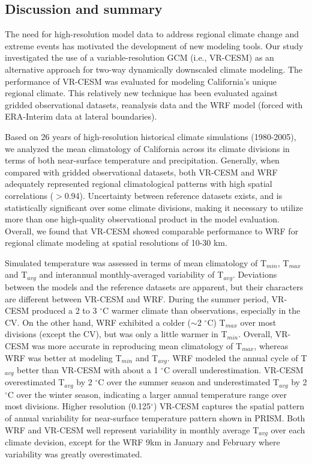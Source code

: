 \documentclass[draft,ms]{agutex}   %
\begin{document}
\begin{article}
\section{Discussion and summary} \label{sec:Discussion}

The need for high-resolution model data to address regional climate change and extreme events has motivated the development of new modeling tools.  Our study investigated the use of a variable-resolution GCM (i.e., VR-CESM) as an alternative approach for two-way dynamically downscaled climate modeling. The performance of VR-CESM was evaluated for modeling California's unique regional climate. This relatively new technique has been evaluated against gridded observational datasets, reanalysis data and the WRF model (forced with ERA-Interim data at lateral boundaries).

Based on 26 years of high-resolution historical climate simulations (1980-2005), we analyzed the mean climatology of California across its climate divisions in terms of both near-surface temperature and precipitation. Generally, when compared with gridded observational datasets, both VR-CESM and WRF adequately represented regional climatological patterns with high spatial correlations ($>$0.94). Uncertainty between reference datasets exists, and is statistically significant over some climate divisions, making it necessary to utilize more than one high-quality observational product in the model evaluation. Overall, we found that VR-CESM showed comparable performance to WRF for regional climate modeling at spatial resolutions of 10-30 km.


Simulated temperature was assessed in terms of mean climatology of T$_{min}$, T$_{max}$ and T$_{avg}$ and interannual monthly-averaged variability of T$_{avg}$.  Deviations between the models and the reference datasets are apparent, but their characters are different between VR-CESM and WRF. During the summer period, VR-CESM produced a 2 to 3 $^\circ$C warmer climate than observations, especially in the CV. On the other hand, WRF exhibited a colder ($\sim$2 $^\circ$C) T$_{max}$ over most divisions (except the CV), but was only a little warmer in T$_{min}$. Overall, VR-CESM was more accurate in reproducing mean climatology of T$_{max}$, whereas WRF was better at modeling T$_{min}$ and T$_{avg}$. WRF modeled the annual cycle of T$_{avg}$ better than VR-CESM with about a 1 $^\circ$C overall underestimation. VR-CESM overestimated T$_{avg}$ by 2 $^\circ$C over the summer season and underestimated T$_{avg}$ by 2 $^\circ$C over the winter season, indicating a larger annual temperature range over most divisions. Higher resolution (0.125$^\circ$) VR-CESM captures the spatial pattern of annual variability for near-surface temperature pattern shown in PRISM. Both WRF and VR-CESM well represent variability in monthly average T$_{avg}$ over each climate devision, except for the WRF 9km in January and February where variability was greatly overestimated.



\end{article}
\end{document}
